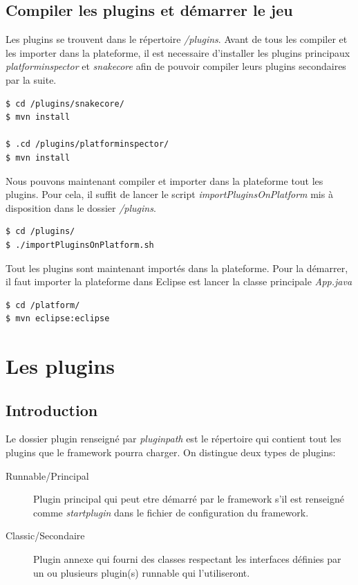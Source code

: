 \documentclass[12pt,a4paper]{article}
\begin{document}
\subsection{Compiler les plugins et démarrer le jeu}
Les plugins se trouvent dans le répertoire \emph{/plugins}. Avant de tous les compiler 
et les importer dans la plateforme, il est necessaire d'installer les plugins 
principaux \emph{platforminspector} et \emph{snakecore} afin de pouvoir compiler 
leurs plugins secondaires par la suite.

\begin{lstlisting}[language=bash,caption=Installation des plugins principaux]
$ cd /plugins/snakecore/
$ mvn install

$ .cd /plugins/platforminspector/
$ mvn install
\end{lstlisting}

Nous pouvons maintenant compiler et importer dans la plateforme tout les plugins. 
Pour cela, il suffit de lancer le script \emph{importPluginsOnPlatform} mis à 
disposition dans le dossier \emph{/plugins}.

\begin{lstlisting}[language=bash,caption=Importer les plugins]
$ cd /plugins/
$ ./importPluginsOnPlatform.sh
\end{lstlisting}

Tout les plugins sont maintenant importés dans la plateforme. Pour la démarrer, il 
faut importer la plateforme dans Eclipse est lancer la classe principale \emph{App.java}

\begin{lstlisting}[language=bash,caption=Démarrer la plateforme]
$ cd /platform/
$ mvn eclipse:eclipse
\end{lstlisting}

\section{Les plugins}
\subsection{Introduction}
Le dossier plugin renseigné par \emph{pluginpath} est le répertoire qui contient 
tout les plugins que le framework pourra charger. On distingue deux types de 
plugins:

\begin{description}
	\item[Runnable/Principal] Plugin principal qui peut etre démarré par le framework s'il 
	est renseigné comme \emph{startplugin} dans le fichier de configuration du 
	framework.
	
	\item[Classic/Secondaire] Plugin annexe qui fourni des classes respectant les interfaces 
	définies par un ou plusieurs plugin(s) runnable qui l'utiliseront.
\end{description}
\end{document}
